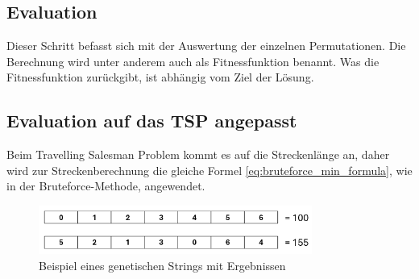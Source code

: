 %
%
%
%
\subsection{Evaluation
\label{buch:paper:varalg:subsection:evaluation}}
Dieser Schritt befasst sich mit der Auswertung der einzelnen 
Permutationen. Die Berechnung wird unter anderem auch als Fitnessfunktion benannt.
Was die Fitnessfunktion zurückgibt, ist abhängig vom Ziel der Lösung.

\subsection{Evaluation auf das TSP angepasst
\label{buch:paper:varalg:subsection:evaluation_tsp}}
Beim Travelling Salesman Problem kommt es auf die Streckenlänge an, 
daher wird zur Streckenberechnung die gleiche Formel \eqref{eq:bruteforce_min_formula},
wie in der Bruteforce-Methode, angewendet.
\begin{figure}
	\centering
	\includegraphics[width=0.8\textwidth]{
        papers/varalg/images/teil3/03GeneticStringCitiesResults.png
        }
	\caption{Beispiel eines genetischen Strings mit Ergebnissen}
	\label{fig:cities_genetic_string_results}
\end{figure}
